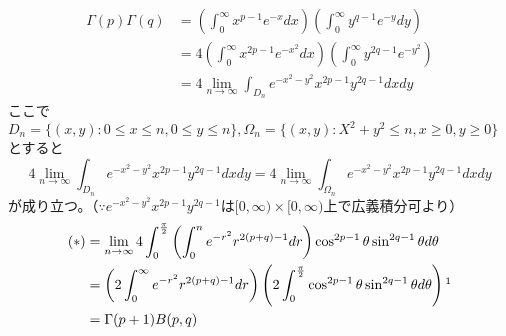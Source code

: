 \documentclass[dvipdfmx,a4j,10pt]{jsarticle}
\makeatletter
\theoremstyle{mystyle1}
\theoremstyle{mystyle2}
\renewenvironment{proof}[1][\proofname]{\par
  \pushQED{\qed}%
  \normalfont
  \topsep6\p@\@plus6\p@ \trivlist
  \item[\hskip\labelsep{\bfseries\sffamily #1}]\ignorespaces
}{%
  \popQED\endtrivlist\@endpefalse
}
\renewcommand\proofname{証明}
\makeatother
\begin{document}
\begin{proof}
	\[
	\begin{split}
	\Gamma(p)\Gamma(q)
	&=\left(\int_0^\infty x^{p-1}e^{-x}dx\right)\left(\int_0^\infty y^{q-1}e^{-y}dy\right)\\
	&=4\left(\int_0^\infty x^{2p-1}e^{-x^2}dx\right)\left(\int_0^\infty y^{2q-1}e^{-y^2}\right)\\
	&=4\lim_{n\to\infty}\int_{D_n}e^{-x^2-y^2}x^{2p-1}y^{2q-1}dxdy	\end{split}
	\]
	ここで$D_n=\{(x,y):0\leq x\leq n,0\leq y\leq n\},\Omega_n=\{(x,y):X^2+y^2\leq n,x\geq0,y\geq0\}$とすると
	\begin{equation}\tag{*}
		4\lim_{n\to\infty}\int_{D_n}e^{-x^2-y^2}x^{2p-1}y^{2q-1}dxdy
		= 4\lim_{n\to\infty}\int_{\Omega_n}e^{-x^2-y^2}x^{2p-1}y^{2q-1}dxdy
	\end{equation}
	が成り立つ。（$\because e^{-x^2-y^2}x^{2p-1}y^{2q-1}$は$[0,\infty)\times[0,\infty)$上で広義積分可より）
	\[
	\begin{split}
		(*)&=\lim_{n\to\infty}4\int_0^{\frac{\pi}{2}}\left(\int_0^n e^{-r^2}r^{2(p+q)-1}dr\right)\cos^{2p-1}\theta\sin^{2q-1}\theta d\theta \\
		&=\left(2\int_0^\infty e^{-r^2}r^{2(p+q)-1}dr\right)\left(2\int_0^{\frac{\pi}{2}}\cos^{2p-1}\theta\sin^{2q-1}\theta d\theta\right)\footnotemark\\
		&=\Gamma(p+1)B(p,q)
	\end{split}
	\]
\end{proof}



\newpage
\end{document}
